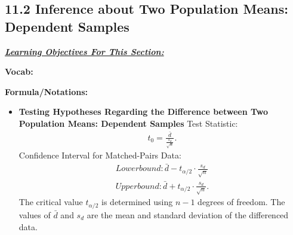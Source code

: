 \documentclass{report}
\begin{document}
    \pagebreak 
    \subsection*{11.2 Inference about Two Population Means: Dependent Samples}
    \bigbreak \noindent 
    \bigbreak \noindent 
    \textbf{\textit{\underline{Learning Objectives For This Section:}}}
    \begin{enumerate}
    
    \end{enumerate}
    \bigbreak \noindent 
    \textbf{Vocab:}
    \begin{itemize}
    
    \end{itemize}
    \pagebreak \bigbreak \noindent 
    \textbf{Formula/Notations:}
    \begin{itemize}
        \item \textbf{Testing Hypotheses Regarding the Difference between Two Population Means: Dependent Samples}
            \bigbreak \noindent 
            Test Statistic:
            \begin{align*}
                t_{0} = \frac{\bar{d}}{\frac{s_{d}}{\sqrt{n}}}
            .\end{align*}
            \bigbreak \noindent 
            Confidence Interval for Matched-Pairs Data:
            \begin{align*}
                Lower bound: \bar{d} - t_{\alpha/2} \cdot \frac{s_d}{\sqrt{n}} \\
                Upper bound: \bar{d} + t_{\alpha/2} \cdot \frac{s_d}{\sqrt{n}}
            .\end{align*}
            \bigbreak \noindent 
            The critical value $t_{\alpha/2}$ is determined using $n-1$ degrees of freedom. The values of $\bar{d}$ and $s_d$ are the mean and standard deviation of the differenced data.
            \bigbreak \noindent 


    
    \end{itemize}
    \pagebreak \bigbreak \noindent 






    
\end{document}
